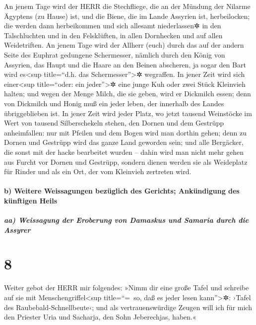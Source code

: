 An jenem Tage wird der HERR die Stechfliege, die an der
Mündung der Nilarme Ägyptens (zu Hause) ist, und die Biene, die im Lande
Assyrien ist, herbeilocken; die werden dann herbeikommen
und sich allesamt niederlassen✲ in den Talschluchten und in den
Felsklüften, in allen Dornhecken und auf allen Weidetriften.
An jenem Tage wird der Allherr (euch) durch das auf der
andern Seite des Euphrat gedungene Schermesser, nämlich durch den König
von Assyrien, das Haupt und die Haare an den Beinen abscheren, ja sogar
den Bart wird es\textless sup title=``d.h. das
Schermesser''\textgreater✲ wegraffen. In jener Zeit wird
sich einer\textless sup title=``oder: ein jeder''\textgreater✲ eine
junge Kuh oder zwei Stück Kleinvieh halten; und wegen der
Menge Milch, die sie geben, wird er Dickmilch essen; denn von Dickmilch
und Honig muß ein jeder leben, der innerhalb des Landes übriggeblieben
ist. In jener Zeit wird jeder Platz, wo jetzt tausend
Weinstöcke im Wert von tausend Silberschekeln stehen, den Dornen und dem
Gestrüpp anheimfallen: nur mit Pfeilen und dem Bogen wird
man dorthin gehen; denn zu Dornen und Gestrüpp wird das ganze Land
geworden sein; und alle Bergäcker, die sonst mit der
hacke bearbeitet wurden -- dahin wird man nicht mehr gehen aus Furcht
vor Dornen und Gestrüpp, sondern dienen werden sie als Weideplatz für
Rinder und als ein Ort, der vom Kleinvieh zertreten wird.

\hypertarget{b-weitere-weissagungen-bezuxfcglich-des-gerichts-ankuxfcndigung-des-kuxfcnftigen-heils}{%
\paragraph{b) Weitere Weissagungen bezüglich des Gerichts; Ankündigung
des künftigen
Heils}\label{b-weitere-weissagungen-bezuxfcglich-des-gerichts-ankuxfcndigung-des-kuxfcnftigen-heils}}

\hypertarget{aa-weissagung-der-eroberung-von-damaskus-und-samaria-durch-die-assyrer}{%
\subparagraph{aa) Weissagung der Eroberung von Damaskus und Samaria
durch die
Assyrer}\label{aa-weissagung-der-eroberung-von-damaskus-und-samaria-durch-die-assyrer}}

\hypertarget{section-7}{%
\section{8}\label{section-7}}

Weiter gebot der HERR mir folgendes: »Nimm dir eine große
Tafel und schreibe auf sie mit Menschengriffel\textless sup
title=``=~so, daß es jeder lesen kann''\textgreater✲: ›Tafel des
Raubebald-Schnellbeute‹; und als vertrauenswürdige Zeugen
will ich für mich den Priester Uria und Sacharja, den Sohn Jeberechjas,
haben.«

